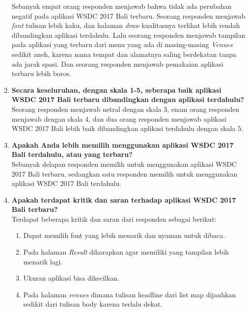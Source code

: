 \begin{enumerate}
	Sebanyak empat orang responden menjawab bahwa tidak ada perubahan negatif pada aplikasi WSDC 2017 Bali terbaru. Seorang responden menjawab \textit{font} tulisan lebih kaku, dan halaman \textit{draw} kualitasnya terlihat lebih rendah dibandingkan aplikasi terdahulu. Lalu seorang responden menjawab tampilan pada aplikasi yang terbaru dari menu yang ada di masing-masing \textit{Venues} sedikit aneh, karena nama tempat dan alamatnya saling berdekatan tanpa ada jarak spasi. Dan seorang responden menjawab pemakaian aplikasi terbaru lebih boros.
	\item \textbf{Secara keseluruhan, dengan skala 1-5, seberapa baik aplikasi WSDC 2017 Bali terbaru dibandingkan dengan aplikasi terdahulu?} \\
	Seorang responden menjawab netral dengan skala 3, enam orang responden menjawab dengan skala 4, dan dua orang responden menjawab aplikasi WSDC 2017 Bali lebih baik dibandingkan aplikasi terdahulu dengan skala 5.
	\item \textbf{Apakah Anda lebih memilih menggunakan aplikasi WSDC 2017 Bali terdahulu, atau yang terbaru?} \\
	Sebanyak delapan responden memilih untuk menggunakan aplikasi WSDC 2017 Bali terbaru, sedangkan satu responden memilih untuk menggunakan aplikasi WSDC 2017 Bali terdahulu.
	\item \textbf{Apakah terdapat kritik dan saran terhadap aplikasi WSDC 2017 Bali terbaru?} \\
	Terdapat beberapa kritik dan saran dari responden sebagai berikut:
	\begin{enumerate}
		\item Dapat memilih font yang lebih menarik dan nyaman untuk dibaca.
		\item Pada halaman \textit{Result} diharapkan agar memiliki yang tampilan lebih menarik lagi.
		\item Ukuran aplikasi bisa dikecilkan.
		\item Pada halaman \textit{venues} dimana tulisan headline dari list map dijauhkan sedikit dari tulisan body karena terlalu dekat.
	\end{enumerate}
\end{enumerate}
